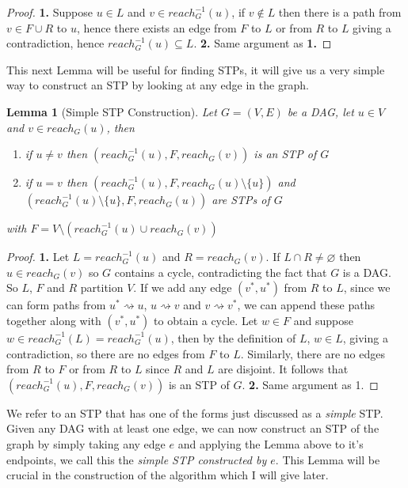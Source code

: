 \documentclass{report}
\newtheorem{lemma}[theorem]{Lemma}
\begin{document}
\begin{proof}
\textbf{1.} Suppose $u \in L$ and $v \in reach_{G}^{-1}(u)$, if $v \notin L$ then there is a path from $v \in F \cup R$ to $u$, hence there exists an edge from $F$ to $L$ or from $R$ to $L$ giving a contradiction, hence $reach_{G}^{-1}(u) \subseteq L$. \textbf{2.} Same argument as \textbf{1.}
\end{proof}

This next Lemma will be useful for finding STPs, it will give us a very simple way to construct an STP by looking at any edge in the graph.

\begin{lemma}[Simple STP Construction]
Let $G=(V,E)$ be a DAG, let $u \in V$ and $v \in reach_{G}(u)$, then
\begin{enumerate}
\item if $u \neq v$ then $(reach_{G}^{-1}(u),F,reach_{G}(v))$ is an STP of $G$
\item if $u = v$ then $(reach_{G}^{-1}(u),F,reach_{G}(u) \setminus{\{u\}})$ and $(reach_{G}^{-1}(u) \setminus{\{u\}},F,reach_{G}(u))$ are STPs of $G$
\end{enumerate}
with $F=V \setminus (reach_{G}^{-1}(u) \cup reach_{G}(v))$
\end{lemma}

\begin{proof}
\textbf{1.} Let $L=reach_{G}^{-1}(u)$ and $R=reach_{G}(v)$. If $L \cap R \neq \varnothing$ then $u \in reach_{G}(v)$ so $G$ contains a cycle, contradicting the fact that $G$ is a DAG. So $L$, $F$ and $R$ partition $V$. If we add any edge $(v^{*},u^{*})$ from $R$ to $L$, since we can form paths from $u^{*} \rightsquigarrow u$, $u \rightsquigarrow v$ and $v \rightsquigarrow v^{*}$, we can append these paths together along with $(v^{*},u^{*})$ to obtain a cycle. Let $w \in F$ and suppose $w \in reach_{G}^{-1}(L) = reach_{G}^{-1}(u)$, then by the definition of $L$, $w \in L$, giving a contradiction, so there are no edges from $F$ to $L$. Similarly, there are no edges from $R$ to $F$ or from $R$ to $L$ since $R$ and $L$ are disjoint. It follows that $(reach_{G}^{-1}(u),F,reach_{G}(v))$ is an STP of $G$.
\textbf{2.} Same argument as 1.
\end{proof}

We refer to an STP that has one of the forms just discussed as a \textit{simple} STP. Given any DAG with at least one edge, we can now construct an STP of the graph by simply taking any edge $e$ and applying the Lemma above to it's endpoints, we call this the \textit{simple STP constructed by $e$}. This Lemma will be crucial in the construction of the algorithm which I will give later.
\end{document}
